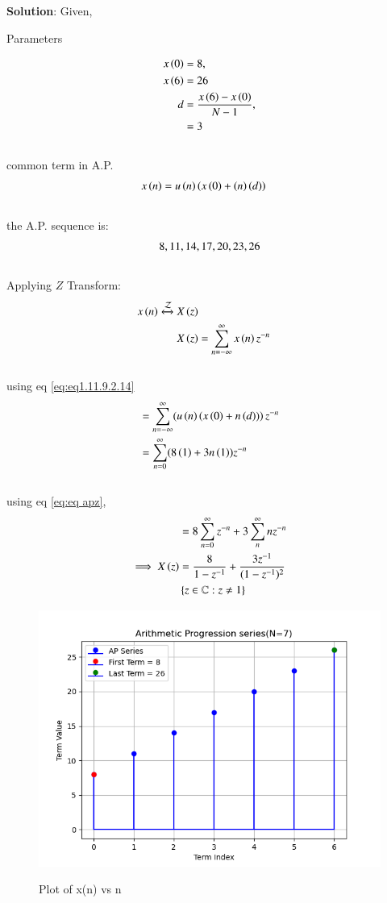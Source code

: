 \documentclass[journal,12pt,twocolumn]{IEEEtran}
\begin{document}
\noindent \textbf{Solution}:
\noindent
Given,
\begin{table}[h]
    \centering
    
    \caption{Parameters}
    \label{tab: 11.9.2.14.1}
\end{table}
\begin{align}
    x\brak{0}&=8,\\  %
    x\brak{6}&=26  \\  %
	d&=\frac{x\brak{6} - x\brak{0}}{N-1},\\
    &=3
\end{align}\\
common term in A.P.
\begin{align}
	x\left(n\right)&=u\left(n\right)\left(x\left(0\right)+\left(n\right)\left(d\right)\right) \label{eq:eq1.11.9.2.14}
\end{align}\\	
the A.P. sequence is:\\
\begin{align}
\notag 8,11,14,17,20,23,26
\end{align}\\
Applying $Z$ Transform:     
\begin{align}
	x \left(n\right) \xleftrightarrow{\mathcal{Z}} X \left(z\right) \\
    X\left(z\right)&=\sum_{n=-\infty}^{\infty} x \left(n\right)z^{-n} 
\end{align}\\
using eq \eqref{eq:eq1.11.9.2.14}
\begin{align}
	&=\sum_{n=-\infty}^{\infty}(u\left(n\right)\left(x\left(0\right)+n\left(d\right))\right)z^{-n}\\
	&=\sum_{n=0}^{\infty} (8\left(1\right) + 3n\left(1\right)) z^{-n}
 \end{align}\\
using eq \eqref{eq:eq apz},
\begin{align}
    &=8 \sum_{n=0}^{\infty}  z^{-n} + 3 \sum_n^{\infty} n z^{-n}\\
    \implies X\left(z\right)&=\frac{8}{1-z^{-1}} + \frac{3 z^{-1}}{(1-z^{-1})^2}\\
    \notag &\left\{z\in\mathbb{C} : z \neq 1\right\}
\end{align}
\begin{figure}[ht]
\centering
   \includegraphics[width=1\linewidth]{figs/plot1.png}
   \caption{Plot of x(n) vs n}
   \hfill\label{fig: 11.9.2.14}
\end{figure}
\end{document}
